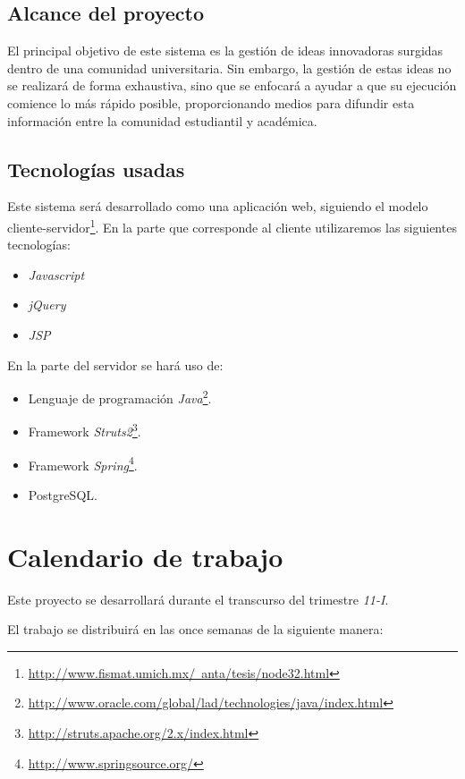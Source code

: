 \documentclass[12pt,letterpaper,titlepage]{article}
\begin{document}
\subsection{Alcance del proyecto}
El principal objetivo de este sistema es la gesti\'on de ideas innovadoras surgidas dentro de una comunidad universitaria. Sin embargo, la gesti\'on de estas ideas no se realizar\'a de forma exhaustiva, sino que se enfocar\'a a ayudar a que su ejecuci\'on comience lo m\'as r\'apido posible, proporcionando medios para difundir esta informaci\'on entre la comunidad estudiantil y acad\'emica.


\subsection{Tecnolog\'ias usadas}
Este sistema ser\'a desarrollado como una aplicaci\'on web, siguiendo el modelo cliente-servidor\footnote{\href{http://www.fismat.umich.mx/~anta/tesis/node32.html}{http://www.fismat.umich.mx/~anta/tesis/node32.html}}. En la parte que corresponde al cliente utilizaremos las siguientes tecnolog\'ias:


\begin{itemize}
 \item \textit{Javascript}
 \item \textit{jQuery}
 \item \textit{JSP}
\end{itemize}
En la parte del servidor se har\'a uso de:
\begin{itemize}
 \item Lenguaje de programaci\'on \textit{Java}\footnote{\href{http://www.oracle.com/global/lad/technologies/java/index.html}{http://www.oracle.com/global/lad/technologies/java/index.html}}.
 \item Framework \textit{Struts2}\footnote{\href{http://struts.apache.org/2.x/index.html}{http://struts.apache.org/2.x/index.html}}.
 \item Framework \textit{Spring}\footnote{\href{http://www.springsource.org/}{http://www.springsource.org/}}.
 \item PostgreSQL.
\end{itemize}
 

\section{Calendario de trabajo}
Este proyecto se desarrollar\'a durante el transcurso del trimestre \textit{11-I}.

El trabajo se distribuir\'a en las once semanas de la siguiente manera:
\end{document}
